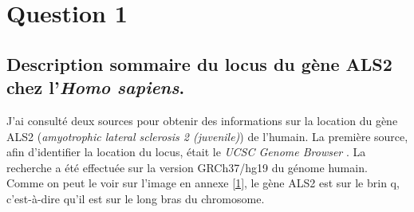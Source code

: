 \documentclass[10.9pt]{article} %
\begin{document}

\tableofcontents %

\newpage %

\section{Question 1} %

\subsection[Description du gène ALS2]{Description sommaire du locus du gène ALS2 chez l'\emph{Homo sapiens}.}

J'ai consulté deux sources pour obtenir des informations sur la location du gène ALS2 (\emph{amyotrophic lateral sclerosis 2 (juvenile)}) de l'humain. La première source,
afin d'identifier la location du locus, était le \emph{UCSC Genome Browser} \cite{UCSC genome browser}. La recherche a été effectuée sur la version GRCh37/hg19
du génome humain. Comme on peut le voir sur l'image en annexe \ref{1}, le gène ALS2 est sur le brin q, c'est-à-dire qu'il est sur le long bras du chromosome.
\end{document}
